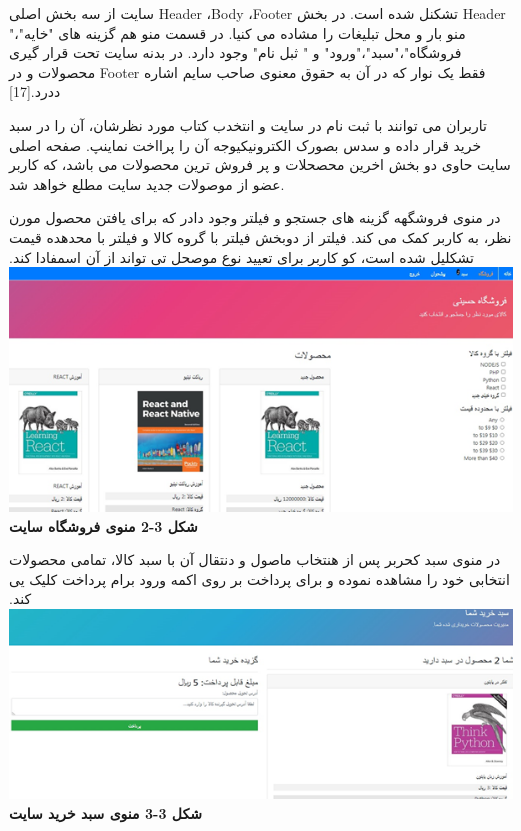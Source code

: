 \documentclass[13pt]{article}
\begin{document}
سایت از سه بخش اصلی Header ،Body ،Footer تشکنل شده است. در بخش Header منو بار و
محل تبلیغات را مشاده می کنیا. در قسمت منو هم گزینه های "خایه"،"
فروشگاه"،"سبد"،"ورود" و " ثبل نام" وجود دارد. در بدنه سایت تحت قرار گیری محصولات
و در Footer فقط یک نوار که در آن به حقوق معنوی صاحب سایم اشاره ددرد.[17]

تاربران می توانند با ثبت نام در سایت و انتخدب کتاب مورد نظرشان، آن را در سبد
خرید قرار داده و سدس بصورک الکترونیکی{\large  }وجه آن را پرااخت نماینپ. صفحه اصلی
سایت حاوی دو بخش \guillemotleft{} اخرین محصحلات\guillemotright{} و
\guillemotleft{} پر فروش ترین محصولات\guillemotright{} می باشد، که کاربر عضو از
موصولات جدید سایت مطلع خواهد شد.

در منوی فروشگهه گزینه های جستجو و فیلتر وجود دادر که برای یافتن محصول مورن نظر،
به کاربر کمک می کند. فیلتر از دوبخش \guillemotleft{} فیلتر با گروه
کالا\guillemotright{} و \guillemotleft{} فیلتر با محدهده قیمت\guillemotright{}
تشکلیل شده است، کو کاربر برای تعیید نوع موصحل تی تواند از آن اسمفادا کند.
\includegraphics[width=451pt]{img-2.png}{\Large  }
\textbf{{\footnotesize شکل 3-2  منوی فروشگاه سایت }}

در منوی \guillemotleft{}سبد\guillemotright{} کحربر پس از هنتخاب ماصول و دنتقال
آن با سبد کالا، تمامی محصولات انتخابی خود را مشاهده نموده و برای پرداخت بر روی
اکمه \guillemotleft{}ورود برام پرداخت\guillemotright{} کلیک یی کند.
\includegraphics[width=451pt]{img-3.png}{\Large  }
\textbf{{\footnotesize شکل 3-3 منوی سبد  خرید سایت}}
\end{document}
